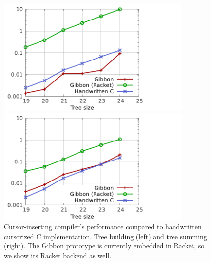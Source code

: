 \documentclass[a4paper,english]{lipics-v2016}
\begin{document}
\begin{figure}[t]
\hspace{-6mm}  
\begin{minipage}{1.00\textwidth}
  \begin{minipage}{.49\textwidth}
    \centering
        \includegraphics[width=3.8in]{./figs/shootout_gibbon_buildtree.pdf}
  \end{minipage}
  \hspace{0.03\textwidth}
  \begin{minipage}{.49\textwidth}
    \centering
    \includegraphics[width=3.8in]{./figs/shootout_gibbon_sumtree.pdf}
  \end{minipage}
\end{minipage}
   \caption{Cursor-inserting compiler's performance compared to handwritten
     cursorized C implementation.  Tree building (left) and tree summing
     (right). The Gibbon prototype is currently embedded in Racket, so we show
     its Racket backend as well.}
   \label{fig:shootout2}
\end{figure}
\end{document}

